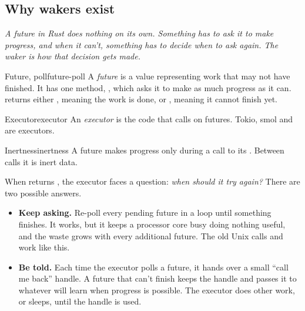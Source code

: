 
\subsection{Why wakers exist}
\label{sec:wakers-ch1}

\textit{A future in Rust does nothing on its own. Something has to ask it to make progress, and when it can't, something has to decide when to ask again. The waker is how that decision gets made.}

\begin{definition}{Future, poll}{future-poll}
    A \emph{future} is a value representing work that may not have finished. It has one method, , which asks it to make as much progress as it can.  returns either , meaning the work is done, or , meaning it cannot finish yet.
\end{definition}

\begin{definition}{Executor}{executor}
    An \emph{executor} is the code that calls  on futures. Tokio, smol and  are executors.
\end{definition}

\begin{axiom}{Inertness}{inertness}
    A future makes progress only during a call to its . Between calls it is inert data.
\end{axiom}

When  returns , the executor faces a question: \emph{when should it try again?} There are two possible answers.

\begin{itemize}
    \item \textbf{Keep asking.} Re-poll every pending future in a loop until something finishes. It works, but it keeps a processor core busy doing nothing useful, and the waste grows with every additional future. The old Unix calls  and  work like this.
    \item \textbf{Be told.} Each time the executor polls a future, it hands over a small ``call me back'' handle. A future that can't finish keeps the handle and passes it to whatever will learn when progress is possible. The executor does other work, or sleeps, until the handle is used.
\end{itemize}

